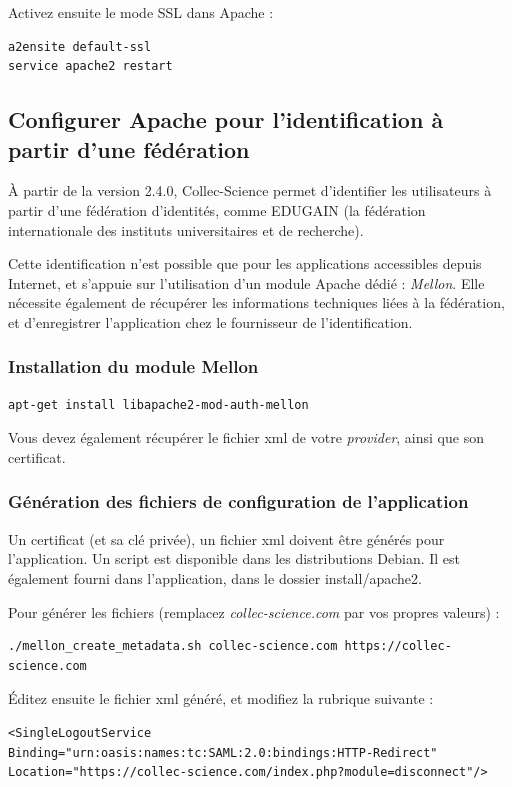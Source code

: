 Activez ensuite le mode SSL dans Apache :
\begin{lstlisting}
a2ensite default-ssl
service apache2 restart
\end{lstlisting}

\subsection{Configurer Apache pour l'identification à partir d'une fédération}
À partir de la version 2.4.0, Collec-Science permet d'identifier les utilisateurs à partir d'une fédération d'identités, comme EDUGAIN (la fédération internationale des instituts universitaires et de recherche).

Cette identification n'est possible que pour les applications accessibles depuis Internet, et s'appuie sur l'utilisation d'un module Apache dédié : \textit{Mellon}. Elle nécessite également de récupérer les informations techniques liées à la fédération, et d'enregistrer l'application chez le fournisseur de l'identification.

\subsubsection{Installation du module Mellon}
\begin{lstlisting}
apt-get install libapache2-mod-auth-mellon
\end{lstlisting}

Vous devez également récupérer le fichier xml de votre \textit{provider}, ainsi que son certificat.

\subsubsection{Génération des fichiers de configuration de l'application}
Un certificat (et sa clé privée), un fichier xml doivent être générés pour l'application. Un script est disponible dans les distributions Debian. Il est également fourni dans l'application, dans le dossier install/apache2.

Pour générer les fichiers (remplacez \textit{collec-science.com} par vos propres valeurs) : 
\begin{lstlisting}
./mellon_create_metadata.sh collec-science.com https://collec-science.com
\end{lstlisting}

Éditez ensuite le fichier xml généré, et modifiez la rubrique suivante :
\begin{lstlisting}
<SingleLogoutService Binding="urn:oasis:names:tc:SAML:2.0:bindings:HTTP-Redirect" Location="https://collec-science.com/index.php?module=disconnect"/>
\end{lstlisting}

